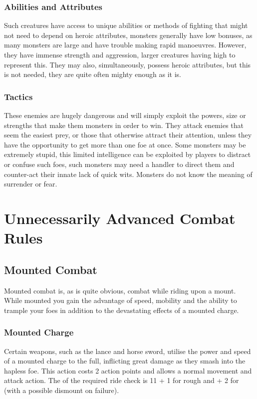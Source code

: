 \documentclass[a4paper,10pt,oneside]{book}
\newcommand{\textlf}[1]{\textbf{\titlecap{#1}}}
\begin{document}
\subsubsection{Abilities and Attributes}
Such creatures have access to unique abilities or methods of fighting that might not need to depend on heroic attributes, monsters generally have low \textlf{aim} bonuses, as many monsters are large and have trouble making rapid manoeuvres. However, they have immense strength and aggression, larger creatures having high \textlf{power} to represent this. They may also, simultaneously, possess heroic attributes, but this is not needed, they are quite often mighty enough as it is. 
\subsubsection{Tactics}
These enemies are hugely dangerous and will simply exploit the powers, size or strengths that make them monsters in order to win. They attack enemies that seem the easiest prey, or those that otherwise attract their attention, unless they have the opportunity to get more than one foe at once. Some monsters may be extremely stupid, this limited intelligence can be exploited by players to distract or confuse such foes, such monsters may need a handler to direct them and counter-act their innate lack of quick wits. Monsters do not know the meaning of surrender or fear.


\section{Unnecessarily Advanced Combat Rules}

\subsection{Mounted Combat}
\label{sec:mountandblade}
Mounted combat is, as is quite obvious, combat while riding upon a mount. While mounted you gain the advantage of speed, mobility and the ability to trample your foes in addition to the devastating effects of a mounted charge.

\subsubsection{Mounted Charge}
Certain weapons, such as the lance and horse sword, utilise the power and speed of a mounted charge to the full, inflicting great damage as they smash into the hapless foe. This action costs 2 action points and allows a normal movement and attack action. The \textlf{difficulty} of the required ride check is 11 + 1 for rough and + 2 for \textlf{dangerous terrain} (with a possible dismount on failure). 
\end{document}
